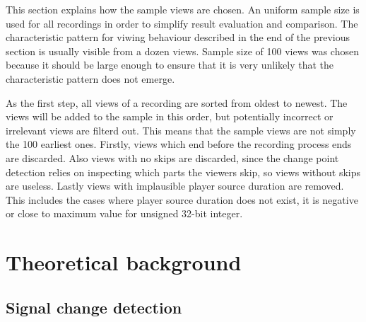 
This section explains how the sample views are chosen. An uniform sample size is used for all recordings in order to simplify result evaluation and comparison. The characteristic pattern for viwing behaviour described in the end of the previous section is usually visible from a dozen views. Sample size of 100 views was chosen because it should be large enough to ensure that it is very unlikely that the characteristic pattern does not emerge. %


As the first step, all views of a recording are sorted from oldest to newest. The views will be added to the sample in this order, but potentially incorrect or irrelevant views are filterd out. This means that the sample views are not simply the 100 earliest ones. Firstly, views which end before the recording process ends are discarded. %
Also views with no skips are discarded, since the change point detection relies on inspecting which parts the viewers skip, so views without skips are useless. %
Lastly views with implausible player source duration are removed. This includes the cases where player source duration does not exist, it is negative or close to maximum value for unsigned 32-bit integer. %

\section{Theoretical background} \label{sec:background}

\subsection{Signal change detection} \label{subsec:methods} %

